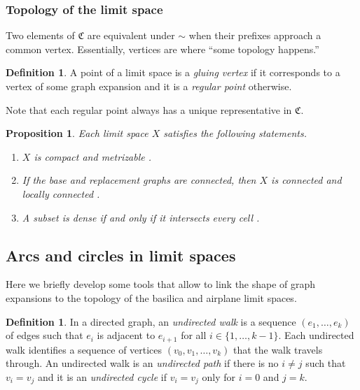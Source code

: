 \documentclass[JEP,XML,SOM,Unicode,NoFloatCountersInSection,published]{cedram}
\theoremstyle{plain}
\newtheorem{proposition}[theorem]{Proposition}
\theoremstyle{definition}
\newtheorem{definition}[theorem]{Definition}
\theoremstyle{remark}
\begin{document}
\subsubsection{Topology of the limit space}

Two elements of $\mathfrak{C}$ are equivalent under $\sim$ when their prefixes approach a common vertex.
Essentially, vertices are where ``some topology happens.''

\begin{definition}
A point of a limit space is a \emph{gluing vertex} if it corresponds to a vertex of some graph expansion and it is a \emph{regular point} otherwise.
\end{definition}

Note that each regular point always has a unique representative in $\mathfrak{C}$.

\begin{proposition}
\label{prop.limit.spaces.facts}
Each limit space $X$ satisfies the following statements.
\begin{enumerate}
\item\label{prop.limit.spaces.facts1} $X$ is compact and metrizable \cite[Th.\,1.25]{Belk-Forrest}.
\item\label{prop.limit.spaces.facts2} If the base and replacement graphs are connected, then $X$ is connected \cite[Rem.\,1.27]{Belk-Forrest} and locally connected \cite[Cor.\,2.33]{thesis}.
\item\label{prop.limit.spaces.facts3} A subset is dense if and only if it intersects every cell \cite[Rem.\,3.2]{IG}.
\end{enumerate}
\end{proposition}

\subsection{Arcs and circles in limit spaces}

Here we briefly develop some tools that allow to link the shape of graph expansions to the topology of the basilica and airplane limit spaces.

\begin{definition}
In a directed graph, an \emph{undirected walk} is a sequence $(e_1, \dots, e_k)$ of edges such that $e_i$ is adjacent to $e_{i+1}$ for all $i\in\{1, \dots, k-1\}$.
Each undirected walk identifies a sequence of vertices $(v_0, v_1, \dots, v_k)$ that the walk travels through.
An undirected walk is an \emph{undirected path} if there is no $i \neq j$ such that $v_i = v_j$ and it is an \emph{undirected cycle} if $v_i = v_j$ only for $i=0$ and $j=k$.
\end{definition}
\end{document}
